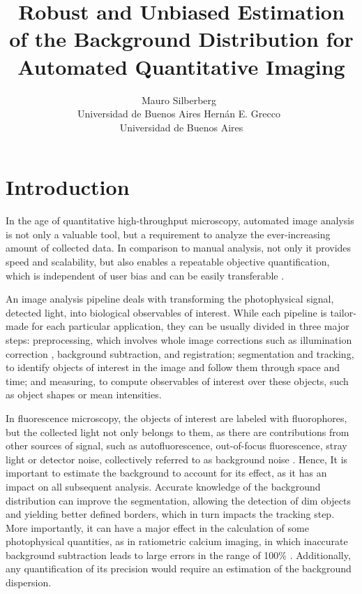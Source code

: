 \documentclass[article]{jss}
\author{Mauro Silberberg~\orcidlink{0000-0002-2402-1100}\\Universidad de Buenos Aires
   \And Hernán E. Grecco~\orcidlink{0000-0002-1165-4320}\\Universidad de Buenos Aires}
\title{Robust and Unbiased Estimation of the Background Distribution for Automated Quantitative Imaging}
\begin{document}


\section{Introduction} \label{sec:intro}

	In the age of quantitative high-throughput microscopy, automated image analysis is not only a valuable tool, but a requirement to analyze the ever-increasing amount of collected data. In comparison to manual analysis, not only it provides speed and scalability, but also enables a repeatable objective quantification, which is independent of user bias and can be easily transferable \citep{Ljosa2009}.

	An image analysis pipeline deals with transforming the photophysical signal, detected light, into biological observables of interest. While each pipeline is tailor-made for each particular application, they can be usually divided in three major steps: preprocessing, which involves whole image corrections such as illumination correction \citep{Singh2014}, background subtraction, and registration; segmentation and tracking, to identify objects of interest in the image and follow them through space and time; and measuring, to compute observables of interest over these objects, such as object shapes or mean intensities.
	
	In fluorescence microscopy, the objects of interest are labeled with fluorophores, but the collected light not only belongs to them, as there are contributions from other sources of signal, such as autofluorescence, out-of-focus fluorescence, stray light or detector noise, collectively referred to as background noise \citep{Waters2014}. Hence, It is important to estimate the background to account for its effect, as it has an impact on all subsequent analysis. Accurate knowledge of the background distribution can improve the segmentation, allowing the detection of dim objects and yielding better defined borders, which in turn impacts the tracking step. More importantly, it can have a major effect in the calculation of some photophysical quantities, as in ratiometric calcium imaging, in which inaccurate background subtraction leads to large errors in the range of 100\% \citep{Chen2006, Shkryl2020}. Additionally, any quantification of its precision would require an estimation of the background dispersion.
	
\end{document}
